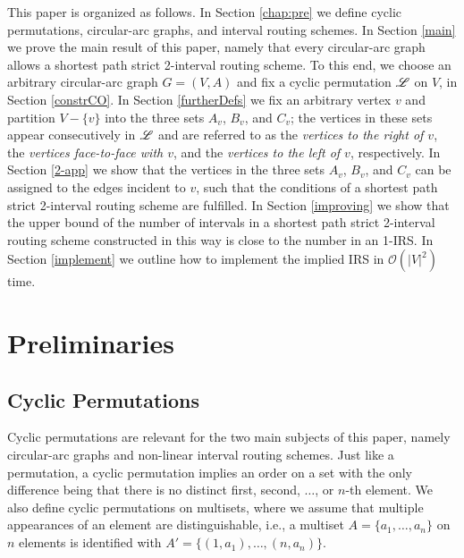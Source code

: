 \documentclass[10pt]{article}
\begin{document}
This paper is organized as follows.
In Section \ref{chap:pre} we define cyclic permutations, circular-arc graphs, 
and  interval routing schemes.  
In Section \ref{main} we prove 
the main result of this paper, namely that every circular-arc graph allows a shortest path 
strict 2-interval routing scheme. 
To this end, we choose an arbitrary circular-arc graph $G=(V,A)$ and 
fix a cyclic permutation $\mathscr{L}$  on $V$, in Section \ref{constrCO}. 
In Section \ref{furtherDefs} we fix an arbitrary vertex $v$ and partition $V-\{v\}$ into the three sets $A_v$, $B_v$, and $C_v$; the vertices in these sets appear consecutively in $\mathscr{L}$ and are referred to as  the \emph{vertices to the right of $v$}, the \emph{vertices face-to-face with $v$}, and the \emph{vertices to the left of $v$}, respectively.
In Section \ref{2-app} we show that the vertices in the 
three sets  $A_v$, $B_v$, and $C_v$ can be assigned to the edges incident to $v$, such that 
the conditions of a shortest path 
strict 2-interval routing scheme are fulfilled. 
In Section \ref{improving} we show that the upper bound of the number of intervals in a shortest path strict 2-interval routing scheme constructed in this way
is close to the number in an 1-IRS.
In Section \ref{implement} we outline  how to 
implement the implied IRS in $\mathcal{O}(|V|^2)$ time.






\section{Preliminaries\label{chap:pre}}




\subsection{Cyclic Permutations}\label{cyclicOrders}



Cyclic permutations are relevant for the two main subjects of this paper, 
namely circular-arc graphs and non-linear interval routing schemes. 
Just like a permutation, a cyclic permutation implies an order on a set 
with the only difference being that there is no distinct first, second, $\ldots$,
or $n$-th element. We also define cyclic permutations on multisets, where
we assume that multiple appearances of an element are
distinguishable, i.e., 
a multiset $A=\{a_1,\ldots,a_n\}$ on $n$ elements is identified with 
$A'=\{(1,a_1),\ldots,(n,a_n)\}$.
\end{document}
